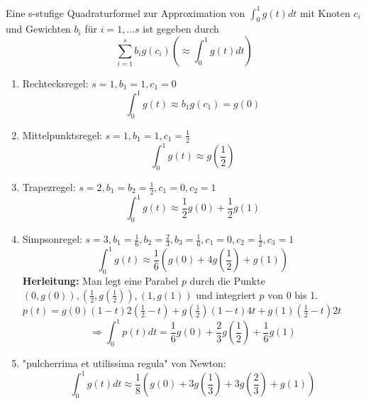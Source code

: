 \begin{definition}[Quadraturformel]
Eine s-stufige Quadraturformel zur Approximation von $\int_0^1 g(t)dt$ mit Knoten $c_i$ und Gewichten $b_i$ für $i=1,...s$ ist gegeben durch 
$$\sum_{i=1}^s b_i g(c_i) \left( \approx \int_0^1 g(t) dt\right)$$

\end{definition}

\begin{example}\leavevmode
\begin{enumerate}
  \item Rechtecksregel: $s = 1, b_1 = 1, c_1 = 0$
    $$ \int_0^1 g(t) \approx b_1 g(c_1) = g(0)$$
  \item Mittelpunktsregel: $s = 1, b_1 = 1, c_1 = \frac{1}{2}$
    $$ \int_0^1 g(t) \approx g\left(\frac{1}{2}\right)$$
  \item Trapezregel: $s=2, b_1=b_2= \frac{1}{2}, c_1 = 0, c_2 = 1$
    $$ \int_0^1 g(t) \approx \frac{1}{2} g(0) + \frac{1}{2}g(1)$$
  \item Simpsonregel: $s=3, b_1 =  \frac{1}{6}, b_2 =  \frac{2}{3}, b_3 =  \frac{1}{6}, c_1 = 0, c_2 =  \frac{1}{2}, c_3 = 1$
    $$ \int_0^1 g(t) \approx \frac{1}{6} \left(g(0) + 4g\left(\frac{1}{2}\right) +g(1)\right)$$ 
    \textbf{Herleitung:} Man legt eine Parabel $p$ durch die Punkte $(0, g(0)), (\frac{1}{2}, g(\frac{1}{2})), (1, g(1))$ und integriert $p$ von 0 bis 1. \\
    $p(t) = g(0)(1-t)2(\frac{1}{2}-t) + g(\frac{1}{2})(1-t)4t + g(1)(\frac{1}{2}-t)2t$ \\
    $$\Rightarrow \int_0^1 p(t)dt = \frac{1}{6}g(0)+ \frac{2}{3}g\left(\frac{1}{2}\right) +\frac{1}{6}g(1)$$ 
  \item "pulcherrima et utilissima regula" von Newton:
    $$\int_0^1 g(t) dt \approx \frac{1}{8}\left(g(0) + 3g\left(\frac{1}{3}\right) + 3g\left(\frac{2}{3}\right) + g(1)\right)$$
\end{enumerate}

\end{example}

